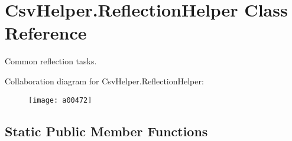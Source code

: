 \hypertarget{a00155}{\section{Csv\-Helper.\-Reflection\-Helper Class Reference}
\label{a00155}
}


Common reflection tasks.  




Collaboration diagram for Csv\-Helper.\-Reflection\-Helper\-:
\nopagebreak
\begin{figure}[H]
\begin{center}
\leavevmode
\texttt{[image: a00472]}
\end{center}
\end{figure}
\subsection*{Static Public Member Functions}
